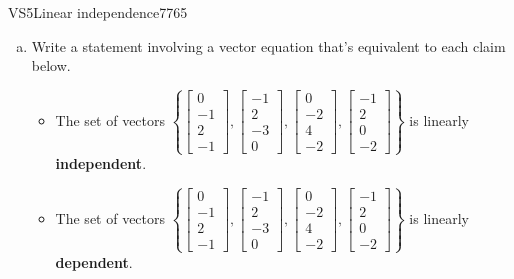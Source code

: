 \begin{exercise}{VS5}{Linear independence}{7765} 
\begin{exerciseStatement} 

\begin{enumerate}[(a)]
\item  

 Write a statement involving a vector equation that's equivalent to each claim below. 

 

\begin{itemize}
\item  

 The set of vectors \(\left\{ \left[\begin{array}{c}
0 \\
-1 \\
2 \\
-1
\end{array}\right] , \left[\begin{array}{c}
-1 \\
2 \\
-3 \\
0
\end{array}\right] , \left[\begin{array}{c}
0 \\
-2 \\
4 \\
-2
\end{array}\right] , \left[\begin{array}{c}
-1 \\
2 \\
0 \\
-2
\end{array}\right] \right\}\) is linearly \textbf{independent}. 

 
\item  

 The set of vectors \(\left\{ \left[\begin{array}{c}
0 \\
-1 \\
2 \\
-1
\end{array}\right] , \left[\begin{array}{c}
-1 \\
2 \\
-3 \\
0
\end{array}\right] , \left[\begin{array}{c}
0 \\
-2 \\
4 \\
-2
\end{array}\right] , \left[\begin{array}{c}
-1 \\
2 \\
0 \\
-2
\end{array}\right] \right\}\) is linearly \textbf{dependent}. 


\end{itemize}
\end{enumerate}
\end{exerciseStatement}
\end{exercise}
